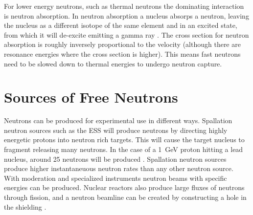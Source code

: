 \documentclass[main.tex]{subfiles}
\begin{document}
For lower energy neutrons, such as thermal neutrons the dominating interaction is neutron absorption. In neutron absorption a nucleus absorps a neutron, leaving the nucleus as a different isotope of the same element and in an excited state, from which it will de-excite emitting a gamma ray \cite{Leo}. The cross section for neutron absorption is roughly inversely proportional to the velocity (although there are resonance energies where the cross section is higher). This means fast neutrons need to be slowed down to thermal energies to undergo neutron capture. 



\section{Sources of Free Neutrons}
Neutrons can be produced for experimental use in different ways. Spallation neutron sources such as the ESS will produce neutrons by directing highly energetic protons into neutron rich targets. This will cause the target nucleus to fragment releasing many neutrons. In the case of a \SI{1}{\GeV} proton hitting a lead nucleus, around 25 neutrons will be produced \cite[pg.46]{Tavernier}. Spallation neutron sources produce higher instantaneuous neutron rates than any other neutron source. With moderation and specialized instruments neutron beams with specific energies can be produced. Nuclear reactors also produce large fluxes of neutrons through fission, and a neutron beamline can be created by constructing a hole in the shielding  \cite{Krane}. 
\end{document}
